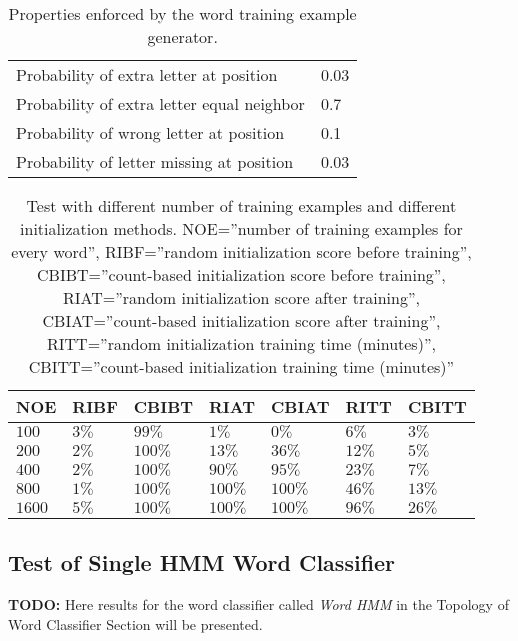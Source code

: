 \begin{table}[htb]
  \begin{center}
  \begin{tabular}{ l l }
    Probability of extra letter at position         & 0.03 \\
    Probability of extra letter equal neighbor      & 0.7 \\ 
    Probability of wrong letter at position         & 0.1 \\ 
    Probability of letter missing at position       & 0.03 \\
  \end{tabular}
\end{center}
\caption{Properties enforced by the word training example generator.} 
\label{tab:word_generator_properties} 
\end{table}

\begin{table}[htb]
  \begin{center}
  \begin{tabular}{ l l l l l l l }
    NOE    & RIBF   & CBIBT  & RIAT    & CBIAT  & RITT & CBITT\\ \hline
    $100$  & $3\%$  & $99\%$    & $1\%$        & $0\%$       & $6\%$    & $3\%$\\ 
    $200$  & $2\%$  & $100\%$  & $13\%$     & $36\%$     & $12\%$  & $5\%$\\ 
    $400$  & $2\%$  & $100\%$  & $90\%$     & $95\%$     & $23\%$  & $7\%$\\
    $800$  & $1\%$  & $100\%$  & $100\%$   & $100\%$  & $46\%$ & $13\%$\\   
    $1600$ & $5\%$ & $100\%$  & $100\%$   & $100\%$  & $96\%$ & $26\%$\\  
  \end{tabular}
\end{center}
\caption{Test with different number of training examples and different initialization methods.
	 NOE=''number of training examples for every word'',
         RIBF=''random initialization score before training'',
         CBIBT=''count-based initialization score before training'',
         RIAT=''random initialization score after training'',
         CBIAT=''count-based initialization score after training'',
         RITT=''random initialization training time (minutes)'',
         CBITT=''count-based initialization training time (minutes)''} 
\label{tab:word_classifier_results_generated_data} 
\end{table}

\subsection{Test of Single HMM Word Classifier}
\textbf{TODO:} Here results for the word classifier called \textit{Word HMM} in the Topology of Word Classifier Section will be presented.


